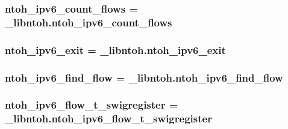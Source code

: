 \hypertarget{namespacelibntoh_aa09bcda8accf8797972c0d17a3370998}{
\subsubsection[{ntoh\-\_\-ipv6\-\_\-count\-\_\-flows}]{\setlength{\rightskip}{0pt plus 5cm}ntoh\-\_\-ipv6\-\_\-count\-\_\-flows = \-\_\-libntoh.\-ntoh\-\_\-ipv6\-\_\-count\-\_\-flows}}\label{namespacelibntoh_aa09bcda8accf8797972c0d17a3370998}
\hypertarget{namespacelibntoh_ac3dc47de40c82fba6f77c99003751cce}{
\subsubsection[{ntoh\-\_\-ipv6\-\_\-exit}]{\setlength{\rightskip}{0pt plus 5cm}ntoh\-\_\-ipv6\-\_\-exit = \-\_\-libntoh.\-ntoh\-\_\-ipv6\-\_\-exit}}\label{namespacelibntoh_ac3dc47de40c82fba6f77c99003751cce}
\hypertarget{namespacelibntoh_ad351882e21d38397f46fef12ded3b15b}{
\subsubsection[{ntoh\-\_\-ipv6\-\_\-find\-\_\-flow}]{\setlength{\rightskip}{0pt plus 5cm}ntoh\-\_\-ipv6\-\_\-find\-\_\-flow = \-\_\-libntoh.\-ntoh\-\_\-ipv6\-\_\-find\-\_\-flow}}\label{namespacelibntoh_ad351882e21d38397f46fef12ded3b15b}
\hypertarget{namespacelibntoh_a623c8d1c690056fbb43b6012c2d64dc1}{
\subsubsection[{ntoh\-\_\-ipv6\-\_\-flow\-\_\-t\-\_\-swigregister}]{\setlength{\rightskip}{0pt plus 5cm}ntoh\-\_\-ipv6\-\_\-flow\-\_\-t\-\_\-swigregister = \-\_\-libntoh.\-ntoh\-\_\-ipv6\-\_\-flow\-\_\-t\-\_\-swigregister}}\label{namespacelibntoh_a623c8d1c690056fbb43b6012c2d64dc1}
